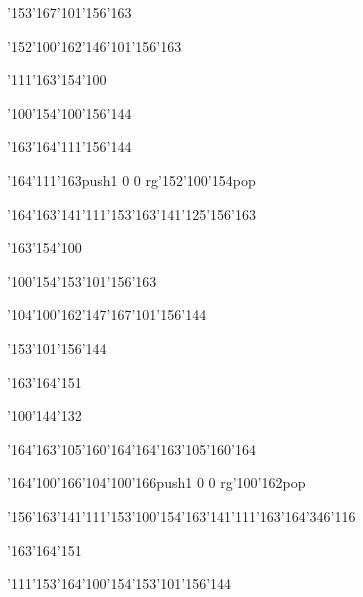 \null\vfill\ipa\centerline{\enskip\enskip\enskip\enskip\enskip\enskip\enskip\enskip\char'153\char'167\char'101\char'156\char'163}\medskip\centerline{\enskip\enskip\enskip\char'152\char'100\char'162\enskip\char'146\char'101\char'156\char'163\enskip\enskip\enskip}\medskip\centerline{\enskip\char'111\enskip\char'163\char'154\char'100\enskip\enskip\enskip\enskip\enskip\enskip}\medskip\centerline{\enskip\char'100\char'154\enskip\char'100\char'156\char'144\enskip\enskip\enskip\enskip\enskip\enskip\enskip}\medskip\centerline{\enskip\enskip\enskip\enskip\enskip\enskip\enskip\enskip\enskip\enskip\enskip\char'163\char'164\char'111\char'156\char'144\enskip\enskip\enskip}\medskip\centerline{\enskip\enskip\enskip\char'164\char'111\char'163\enskip\enskip\enskip\enskip\enskip\pdfcolorstack\match push{1 0 0 rg}\char'152\char'100\char'154\pdfcolorstack\match pop{}\enskip\enskip\enskip}\medskip\centerline{\enskip\char'164\char'163\char'141\char'111\char'153\enskip\enskip\enskip\enskip\char'163\char'141\char'125\char'156\char'163\enskip\enskip\enskip}\medskip\centerline{\enskip\enskip\enskip\char'163\char'154\char'100\enskip\enskip\enskip\enskip\enskip\enskip}\medskip\centerline{\enskip\char'100\char'154\enskip\enskip\enskip\enskip\enskip\enskip\enskip\enskip\char'153\char'101\char'156\char'163}\medskip\vfill\footline{\hfil\tt\folio\hfil}\eject
\null\vfill\ipa\centerline{\enskip\enskip\enskip\enskip\char'104\char'100\char'162\enskip\char'147\char'167\char'101\char'156\char'144}\medskip\centerline{\enskip\enskip\enskip\enskip\enskip\enskip\enskip\char'153\char'101\char'156\char'144\enskip\enskip\enskip}\medskip\centerline{\enskip\enskip\enskip\char'163\char'164\char'151\enskip\enskip\enskip\enskip\enskip\enskip}\medskip\centerline{\enskip\enskip\enskip\enskip\char'100\char'144\char'132\enskip\enskip\enskip\enskip\enskip\enskip\enskip}\medskip\centerline{\enskip\enskip\enskip\enskip\enskip\char'164\char'163\char'105\char'160\char'164\enskip\char'164\char'163\char'105\char'160\char'164\enskip\enskip\enskip}\medskip\centerline{\enskip\enskip\enskip\enskip\enskip\enskip\enskip\char'164\char'100\char'166\enskip\char'104\char'100\char'166\enskip\pdfcolorstack\match push{1 0 0 rg}\char'100\char'162\pdfcolorstack\match pop{}}\medskip\centerline{\enskip\char'156\char'163\char'141\char'111\char'153\enskip\char'100\char'154\enskip\char'163\char'141\char'111\char'163\char'164\enskip\char'346\char'116}\medskip\centerline{\enskip\enskip\enskip\char'163\char'164\char'151\enskip\enskip\enskip\enskip\enskip\enskip}\medskip\centerline{\enskip\char'111\char'153\enskip\enskip\enskip\enskip\char'164\char'100\char'154\enskip\char'153\char'101\char'156\char'144}\medskip\vfill\footline{\hfil\tt\folio\hfil}\eject

